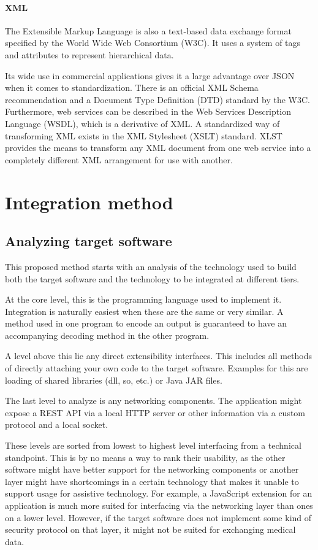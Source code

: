 \documentclass[BSA,Bachelor,english]{twbook}%
\begin{document}
\subsubsection{XML}

The Extensible Markup Language is also a text-based data exchange format specified\cite{XML} by the World Wide Web Consortium (W3C). It uses a system of tags and attributes to represent hierarchical data.

Its wide use in commercial applications gives it a large advantage over JSON when it comes to standardization. There is an official XML Schema recommendation and a Document Type Definition (DTD) standard by the W3C. Furthermore, web services can be described in the Web Services Description Language (WSDL), which is a derivative of XML. A standardized way of transforming XML exists in the XML Stylesheet (XSLT) standard. XLST provides the means to transform any XML document from one web service into a completely different XML arrangement for use with another.

\newpage
\chapter{Integration method}

\section{Analyzing target software}
This proposed method starts with an analysis of the technology used to build both the target software and the technology to be integrated at different tiers.

At the core level, this is the programming language used to implement it. Integration is naturally easiest when these are the same or very similar. A method used in one program to encode an output is guaranteed to have an accompanying decoding method in the other program. 

A level above this lie any direct extensibility interfaces. This includes all methods of directly attaching your own code to the target software. Examples for this are loading of shared libraries (dll, so, etc.) or Java JAR files.

The last level to analyze is any networking components. The application might expose a REST API via a local HTTP server or other information via a custom protocol and a local socket.

These levels are sorted from lowest to highest level interfacing from a technical standpoint. This is by no means a way to rank their usability, as the other software might have better support for the networking components or another layer might have shortcomings in a certain technology that makes it unable to support usage for assistive technology. For example, a JavaScript extension for an application is much more suited for interfacing via the networking layer than ones on a lower level. However, if the target software does not implement some kind of security protocol on that layer, it might not be suited for exchanging medical data.
\end{document}
